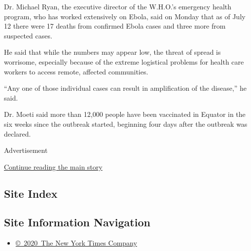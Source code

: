Dr. Michael Ryan, the executive director of the W.H.O.'s emergency
health program, who has worked extensively on Ebola, said on Monday that
as of July 12 there were 17 deaths from confirmed Ebola cases and three
more from suspected cases.

He said that while the numbers may appear low, the threat of spread is
worrisome, especially because of the extreme logistical problems for
health care workers to access remote, affected communities.

``Any one of those individual cases can result in amplification of the
disease,'' he said.

Dr. Moeti said more than 12,000 people have been vaccinated in Equator
in the six weeks since the outbreak started, beginning four days after
the outbreak was declared.

Advertisement

\protect\hyperlink{after-bottom}{Continue reading the main story}

\hypertarget{site-index}{%
\subsection{Site Index}\label{site-index}}

\hypertarget{site-information-navigation}{%
\subsection{Site Information
Navigation}\label{site-information-navigation}}

\begin{itemize}
\tightlist
\item
  \href{https://help.nytimes3xbfgragh.onion/hc/en-us/articles/115014792127-Copyright-notice}{©~2020~The
  New York Times Company}
\end{itemize}

